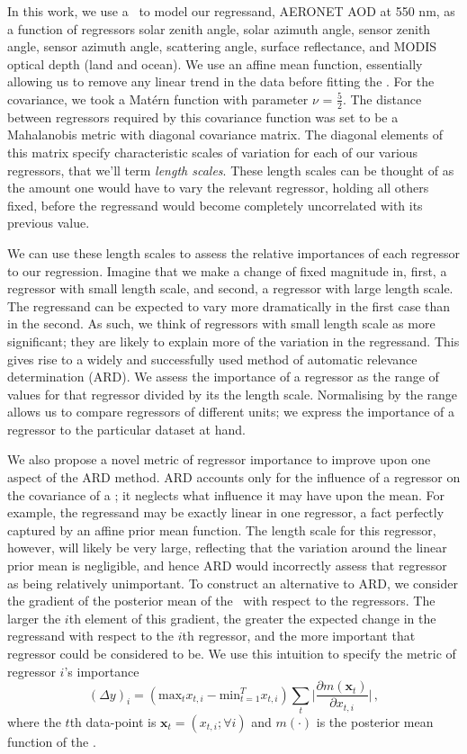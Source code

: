 \documentclass[journal]{IEEEtran}
\begin{document}
In this work, we use a \gp\ to model our regressand, AERONET AOD at 550 nm, as a function of regressors solar zenith angle, solar azimuth angle,  sensor zenith angle, sensor azimuth angle,  scattering angle, surface reflectance, and MODIS optical depth (land and ocean). We use an affine mean function, essentially allowing us to remove any linear trend in the data before fitting the \gp. For the covariance, we took a Mat\'{e}rn function with parameter $\nu$ = $\frac{5}{2}$. The distance between regressors required by this covariance function was set to be a Mahalanobis metric with diagonal covariance matrix. The diagonal elements of this matrix specify characteristic scales of variation for each of our various regressors, that we'll term \emph{length scales}. These length scales can be thought of as the amount one would have to vary the relevant regressor, holding all others fixed, before the regressand would become completely uncorrelated with its previous value.  

We can use these length scales to assess the relative importances of each regressor to our regression. Imagine that we make a change of fixed magnitude in, first, a regressor with small length scale, and second, a regressor with large length scale. The regressand can be expected to vary more dramatically in the first case than in the second. As such, we think of regressors with small length scale as more significant; they are likely to explain more of the variation in the regressand. This gives rise to a widely and successfully used \cite{GPsBook} method of automatic relevance determination (ARD). We assess the importance of a regressor as the range of values for that regressor divided by its the length scale. Normalising by the range allows us to compare regressors of different units; we express the importance of a regressor to the particular dataset at hand. 

We also propose a novel metric of regressor importance to improve upon one aspect of the ARD method. ARD accounts only for the influence of a regressor on the covariance of a \gp; it neglects what influence it may have upon the mean. For example, the regressand may be exactly linear in one regressor, a fact perfectly captured by an affine prior mean function. The length scale for this regressor, however, will likely be very large, reflecting that the variation around the linear prior mean is negligible, and hence ARD would incorrectly assess that regressor as being relatively unimportant. To construct an alternative to ARD, we consider the gradient of the posterior mean of the \gp\ with respect to the regressors. The larger the $i$th element of this gradient, the greater the expected change in the regressand with respect to the $i$th regressor, and the more important that regressor could be considered to be. We use this intuition to specify the metric of regressor $i$'s importance
$$(\Delta y)_i = (\text{max}_t x_{t,i} - \text{min}_{t=1}^T x_{t,i} ) \sum_t \Big\lvert\frac{\partial m(\bm{x}_{t})}{\partial x_{t,i}}\Big\rvert\,,$$
where the $t$th data-point is $\bm{x}_t = (x_{t,i}; \forall i)$ and $m(\cdot)$ is the posterior mean function of the \gp.
\end{document}
